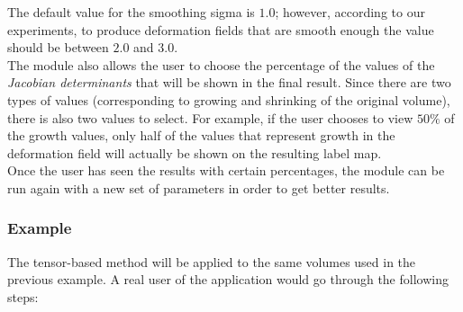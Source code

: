The default value for the smoothing sigma is $1.0$; however, according
to our experiments, to produce deformation fields that are smooth
enough the value should be between $2.0$ and $3.0$.\\

The module also allows the user to choose the percentage of the values
of the \textit{Jacobian determinants} that will be shown in the final
result. Since there are two types of values (corresponding to growing
and shrinking of the original volume), there is also two values to
select. For example, if the user chooses to view $50\%$ of the growth
values, only half of the values that represent growth in the
deformation field will actually be shown on the resulting label map.\\

Once the user has seen the results with certain percentages, the
module can be run again with a new set of parameters in order to get
better results.

\subsubsection{Example}
The tensor-based method will be applied to the same volumes used in
the previous example. A real user of the application would go through
the following steps:

